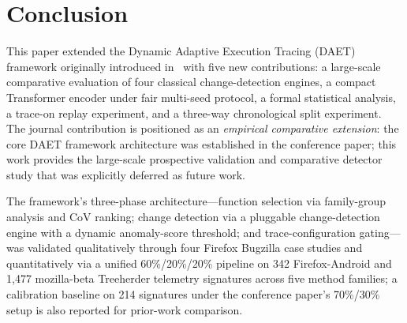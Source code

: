 \documentclass[a4paper,fleqn]{cas-sc}
\theoremstyle{plain}
\begin{document}
\section{Conclusion}\label{sec:conclusion}

This paper extended the Dynamic Adaptive Execution Tracing (DAET) framework
originally introduced in~\cite{10197790} with five new contributions:
a large-scale comparative evaluation of four classical change-detection engines,
a compact Transformer encoder under fair multi-seed protocol, a formal
statistical analysis, a trace-on replay experiment, and a
three-way chronological split experiment.
The journal contribution is positioned as an \emph{empirical comparative
extension}: the core DAET framework architecture was established in the
conference paper; this work provides the large-scale prospective validation
and comparative detector study that was explicitly deferred as future work.

The framework's three-phase architecture---function selection via
family-group analysis and CoV ranking; change detection via a pluggable
change-detection engine with a dynamic anomaly-score threshold; and
trace-configuration gating---was
validated qualitatively through four Firefox Bugzilla case studies and
quantitatively via a unified 60\%/20\%/20\% pipeline on 342 Firefox-Android
and 1{,}477 mozilla-beta Treeherder telemetry signatures across five method
families; a calibration baseline on 214 signatures under the conference paper's
70\%/30\% setup is also reported for prior-work comparison.
\end{document}

